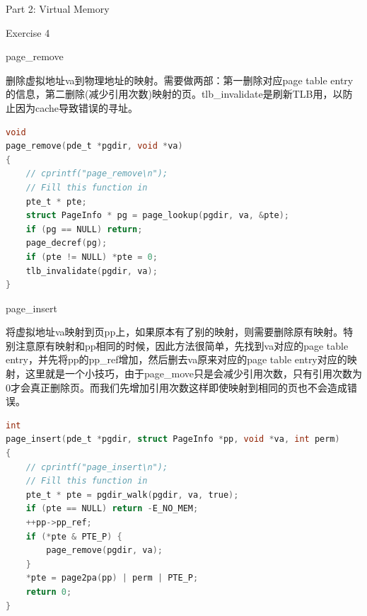 \documentclass[GBK,winfonts,a4paper,10pt]{ctexart}
\begin{document}
\begin{section}{Part 2: Virtual Memory}
\begin{subsection}{Exercise 4}
\begin{subsubsection}{page\_remove}
\par
删除虚拟地址va到物理地址的映射。需要做两部：第一删除对应page table entry的信息，第二删除(减少引用次数)映射的页。tlb\_invalidate是刷新TLB用，以防止因为cache导致错误的寻址。
\begin{lstlisting}[language=C]
void
page_remove(pde_t *pgdir, void *va)
{
    // cprintf("page_remove\n");
	// Fill this function in
    pte_t * pte;
    struct PageInfo * pg = page_lookup(pgdir, va, &pte);
    if (pg == NULL) return;
    page_decref(pg);
    if (pte != NULL) *pte = 0;
    tlb_invalidate(pgdir, va); 
}
\end{lstlisting}
\end{subsubsection}

\begin{subsubsection}{page\_insert}
\par
将虚拟地址va映射到页pp上，如果原本有了别的映射，则需要删除原有映射。特别注意原有映射和pp相同的时候，因此方法很简单，先找到va对应的page table entry，并先将pp的pp\_ref增加，然后删去va原来对应的page table entry对应的映射，这里就是一个小技巧，由于page\_move只是会减少引用次数，只有引用次数为0才会真正删除页。而我们先增加引用次数这样即使映射到相同的页也不会造成错误。
\begin{lstlisting}[language=C]
int
page_insert(pde_t *pgdir, struct PageInfo *pp, void *va, int perm)
{
    // cprintf("page_insert\n");
	// Fill this function in
    pte_t * pte = pgdir_walk(pgdir, va, true);
    if (pte == NULL) return -E_NO_MEM;
    ++pp->pp_ref;
    if (*pte & PTE_P) {
        page_remove(pgdir, va);
    }
    *pte = page2pa(pp) | perm | PTE_P;        
	return 0;
}
\end{lstlisting}
\end{subsubsection}

\end{subsection}

\end{section}
\end{document}
